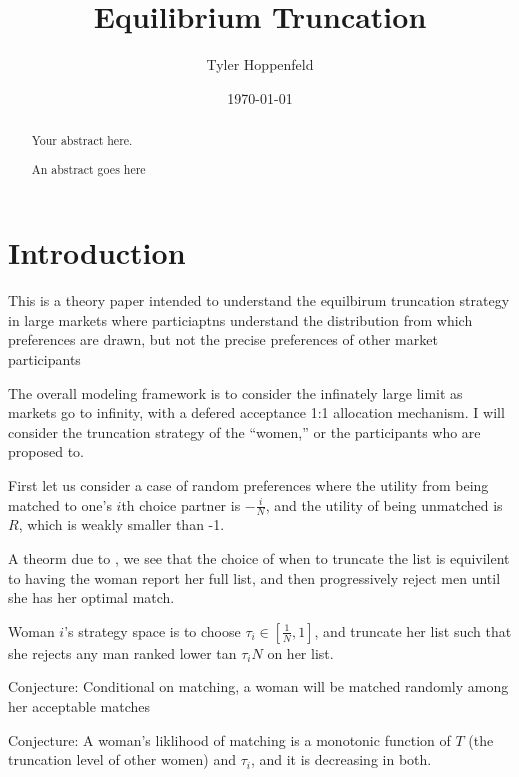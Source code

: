 \documentclass[WP]{AEA}
\begin{document}
\title{Equilibrium Truncation}
\author{Tyler Hoppenfeld}
\date{\today}
\JEL{}
\Keywords{}

\begin{abstract}
Your abstract here.
\end{abstract}


\maketitle

\begin{abstract}
	An abstract goes here
\end{abstract}

\section{Introduction}

This is a theory paper intended to understand the equilbirum truncation strategy in large markets where particiaptns understand the distribution from which preferences are drawn, but not the precise preferences of other market participants

The overall modeling framework is to consider the infinately large limit as markets go to infinity, with a defered acceptance 1:1 allocation mechanism. I will consider the truncation strategy of the ``women,'' or the participants who are proposed to.

First let us consider a case of random preferences where the utility from being matched to one's $i$th choice partner is $-\frac{i}{N}$, and the utility of being unmatched is $R$, which is weakly smaller than -1.

A theorm due to \cite{Coles2014a}, we see that the choice of when to truncate the list is equivilent to having the woman report her full list, and then progressively reject men until she has her optimal match.

Woman $i$'s strategy space is to choose $\tau_i \in [\frac{1}{N}, 1]$, and truncate her list such that she rejects any man ranked lower tan $\tau_i N$ on her list.

Conjecture: Conditional on matching, a woman will be matched randomly among her acceptable matches

Conjecture: A woman's liklihood of matching is a monotonic function of $T$ (the truncation level of other women) and $\tau_i$, and it is decreasing in both.  
\end{document}
